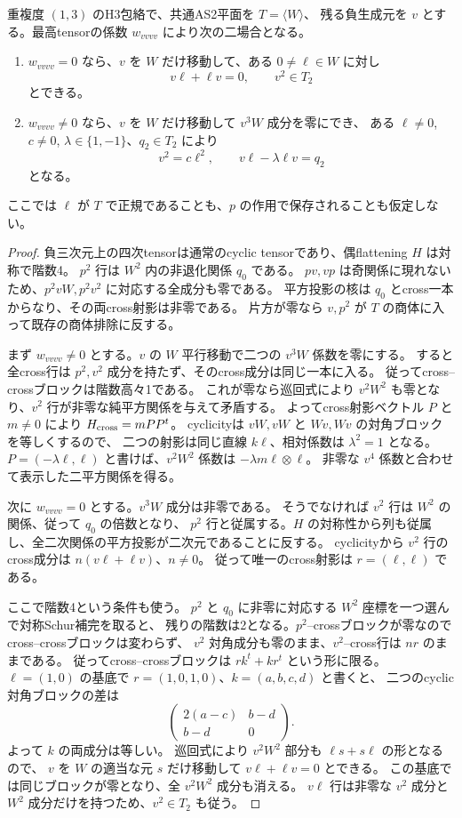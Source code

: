 \begin{lemma}[外側四乗による二つの全域cross標準形]
\label{lem:h3-order2-global-cross-forms}
重複度 $(1,3)$ のH3包絡で、共通AS2平面を $T=\langle W\rangle$、
残る負生成元を $v$ とする。最高tensorの係数 $w_{vvvv}$ により次の二場合となる。
\begin{enumerate}
\item $w_{vvvv}=0$ なら、$v$ を $W$ だけ移動して、ある $0\ne\ell\in W$ に対し
\[
 v\ell+\ell v=0,\qquad v^2\in T_2
\]
とできる。
\item $w_{vvvv}\ne0$ なら、$v$ を $W$ だけ移動して $v^3W$ 成分を零にでき、
ある $\ell\ne0$, $c\ne0$, $\lambda\in\{1,-1\}$、$q_2\in T_2$ により
\[
 v^2=c\ell^2,\qquad v\ell-\lambda\ell v=q_2
\]
となる。
\end{enumerate}
ここでは $\ell$ が $T$ で正規であることも、$p$ の作用で保存されることも仮定しない。
\end{lemma}
\begin{proof}
負三次元上の四次tensorは通常のcyclic tensorであり、偶flattening $H$ は対称で階数4。
$p^2$ 行は $W^2$ 内の非退化関係 $q_0$ である。
$pv,vp$ は奇関係に現れないため、$p^2vW,p^2v^2$ に対応する全成分も零である。
平方投影の核は $q_0$ とcross一本からなり、その両cross射影は非零である。
片方が零なら $v,p^2$ が $T$ の商体に入って既存の商体排除に反する。

まず $w_{vvvv}\ne0$ とする。$v$ の $W$ 平行移動で二つの $v^3W$ 係数を零にする。
すると全cross行は $p^2,v^2$ 成分を持たず、そのcross成分は同じ一本に入る。
従ってcross--crossブロックは階数高々1である。
これが零なら巡回式により $v^2W^2$ も零となり、$v^2$ 行が非零な純平方関係を与えて矛盾する。
よってcross射影ベクトル $P$ と $m\ne0$ により $H_{\rm cross}=mPP^t$。
cyclicityは $vW,vW$ と $Wv,Wv$ の対角ブロックを等しくするので、
二つの射影は同じ直線 $k\ell$、相対係数は $\lambda^2=1$ となる。
$P=(-\lambda\ell,\ell)$ と書けば、$v^2W^2$ 係数は $-\lambda m\ell\otimes\ell$。
非零な $v^4$ 係数と合わせて表示した二平方関係を得る。

次に $w_{vvvv}=0$ とする。$v^3W$ 成分は非零である。
そうでなければ $v^2$ 行は $W^2$ の関係、従って $q_0$ の倍数となり、
$p^2$ 行と従属する。$H$ の対称性から列も従属し、全二次関係の平方投影が二次元であることに反する。
cyclicityから $v^2$ 行のcross成分は $n(v\ell+\ell v)$、$n\ne0$。
従って唯一のcross射影は $r=(\ell,\ell)$ である。

ここで階数4という条件も使う。
$p^2$ と $q_0$ に非零に対応する $W^2$ 座標を一つ選んで対称Schur補完を取ると、
残りの階数は2となる。$p^2$--crossブロックが零なのでcross--crossブロックは変わらず、
$v^2$ 対角成分も零のまま、$v^2$--cross行は $nr$ のままである。
従ってcross--crossブロックは $rk^t+kr^t$ という形に限る。
$\ell=(1,0)$ の基底で $r=(1,0,1,0)$、$k=(a,b,c,d)$ と書くと、
二つのcyclic対角ブロックの差は
\[
 \begin{pmatrix}2(a-c)&b-d\\b-d&0\end{pmatrix}.
\]
よって $k$ の両成分は等しい。
巡回式により $v^2W^2$ 部分も $\ell s+s\ell$ の形となるので、
$v$ を $W$ の適当な元 $s$ だけ移動して $v\ell+\ell v=0$ とできる。
この基底では同じブロックが零となり、全 $v^2W^2$ 成分も消える。
$v\ell$ 行は非零な $v^2$ 成分と $W^2$ 成分だけを持つため、$v^2\in T_2$ も従う。
\end{proof}

